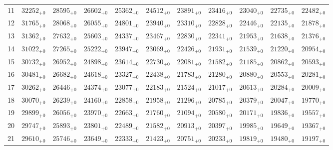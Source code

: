 \documentclass[10pt, a4paper]{article}
\begin{document}
\begin{center}
\begin{tabular}{c || c c c c c | c c c c c}
        \hline
        11 & \({32252}_{+0}\) & \({28595}_{+0}\) & \({26602}_{+0}\) & \({25362}_{+0}\) & \({24512}_{+0}\) & \({23891}_{+0}\) & \({23416}_{+0}\) & \({23040}_{+0}\) & \({22735}_{+0}\) & \({22482}_{+0}\)\\
        12 & \({31765}_{+0}\) & \({28068}_{+0}\) & \({26055}_{+0}\) & \({24801}_{+0}\) & \({23940}_{+0}\) & \({23310}_{+0}\) & \({22828}_{+0}\) & \({22446}_{+0}\) & \({22135}_{+0}\) & \({21878}_{+0}\)\\
        13 & \({31362}_{+0}\) & \({27632}_{+0}\) & \({25603}_{+0}\) & \({24337}_{+0}\) & \({23467}_{+0}\) & \({22830}_{+0}\) & \({22341}_{+0}\) & \({21953}_{+0}\) & \({21638}_{+0}\) & \({21376}_{+0}\)\\
        14 & \({31022}_{+0}\) & \({27265}_{+0}\) & \({25222}_{+0}\) & \({23947}_{+0}\) & \({23069}_{+0}\) & \({22426}_{+0}\) & \({21931}_{+0}\) & \({21539}_{+0}\) & \({21220}_{+0}\) & \({20954}_{+0}\)\\
        15 & \({30732}_{+0}\) & \({26952}_{+0}\) & \({24898}_{+0}\) & \({23614}_{+0}\) & \({22730}_{+0}\) & \({22081}_{+0}\) & \({21582}_{+0}\) & \({21185}_{+0}\) & \({20862}_{+0}\) & \({20593}_{+0}\)\\
        \hline
        16 & \({30481}_{+0}\) & \({26682}_{+0}\) & \({24618}_{+0}\) & \({23327}_{+0}\) & \({22438}_{+0}\) & \({21783}_{+0}\) & \({21280}_{+0}\) & \({20880}_{+0}\) & \({20553}_{+0}\) & \({20281}_{+0}\)\\
        17 & \({30262}_{+0}\) & \({26446}_{+0}\) & \({24374}_{+0}\) & \({23077}_{+0}\) & \({22183}_{+0}\) & \({21524}_{+0}\) & \({21017}_{+0}\) & \({20613}_{+0}\) & \({20284}_{+0}\) & \({20009}_{+0}\)\\
        18 & \({30070}_{+0}\) & \({26239}_{+0}\) & \({24160}_{+0}\) & \({22858}_{+0}\) & \({21958}_{+0}\) & \({21296}_{+0}\) & \({20785}_{+0}\) & \({20379}_{+0}\) & \({20047}_{+0}\) & \({19770}_{+0}\)\\
        19 & \({29899}_{+0}\) & \({26056}_{+0}\) & \({23970}_{+0}\) & \({22663}_{+0}\) & \({21760}_{+0}\) & \({21094}_{+0}\) & \({20580}_{+0}\) & \({20171}_{+0}\) & \({19836}_{+0}\) & \({19557}_{+0}\)\\
        20 & \({29747}_{+0}\) & \({25893}_{+0}\) & \({23801}_{+0}\) & \({22489}_{+0}\) & \({21582}_{+0}\) & \({20913}_{+0}\) & \({20397}_{+0}\) & \({19985}_{+0}\) & \({19649}_{+0}\) & \({19367}_{+0}\)\\
        \hline
        21 & \({29610}_{+0}\) & \({25746}_{+0}\) & \({23649}_{+0}\) & \({22333}_{+0}\) & \({21423}_{+0}\) & \({20751}_{+0}\) & \({20233}_{+0}\) & \({19819}_{+0}\) & \({19480}_{+0}\) & \({19197}_{+0}\)\\

\end{tabular}
\end{center}
\end{document}
